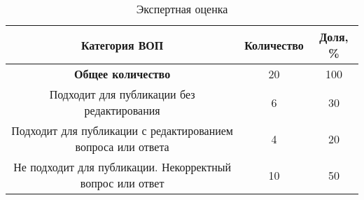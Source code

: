 \begin{table}[!ht]
\caption{Экспертная оценка}
\label{qualityExpert}
\centering
\begin{tabular}{|c|c|c|}
\hline
Категория ВОП & Количество & Доля, \% \\
\hline
\parbox[t]{4cm}{\textbf{Общее количество}} & 20 & 100 \\

	 \hline
\parbox[t]{4cm}{Подходит для публикации без редактирования} & 6 & 30 \\

	 \hline
\parbox[t]{4cm}{Подходит для публикации с редактированием вопроса или ответа} & 4 & 20\\

	 \hline
\parbox[t]{4cm}{Не подходит для публикации. Некорректный вопрос или ответ} & 10 & 50\\
\hline
\end{tabular}
\end{table}

